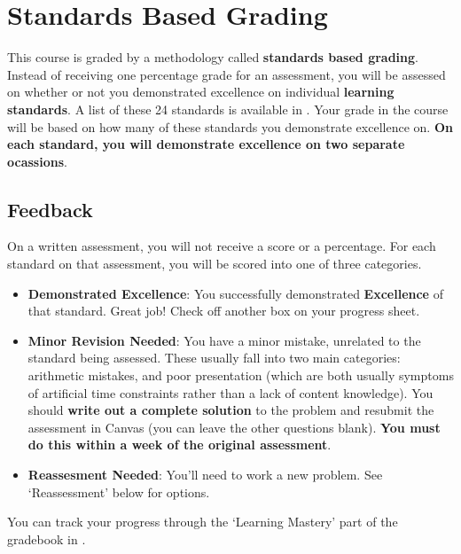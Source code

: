 \documentclass{article}
\begin{document}
\section*{\fontsize{12}{15}\selectfont Standards Based Grading}
This course is graded by a methodology called {\bf standards based grading}.  Instead of receiving one percentage grade for an assessment, you will be assessed on whether or not you demonstrated excellence on individual {\bf learning standards}.  A list of these 24 standards is available in \LMS.  Your grade in the course will be based on how many of these standards you demonstrate excellence on.  {\bf On each standard, you will demonstrate excellence on two separate ocassions}.



    \subsection*{\fontsize{10}{12}\selectfont Feedback}
    On a written assessment, you will not receive a score or a percentage.  For each standard on that assessment, you will be scored into one of three categories.
\begin{itemize}
    \item \textbf{Demonstrated Excellence}: You successfully demonstrated {\bf Excellence} of that standard.  Great job!  Check off another box on your progress sheet.
    \item \textbf{Minor Revision Needed}: You have a minor mistake, unrelated to the standard being assessed.  These usually fall into two main categories: arithmetic mistakes, and poor presentation (which are both usually symptoms of artificial time constraints rather than a lack of content knowledge).  You should {\bf write out a complete solution} to the problem and resubmit the assessment in Canvas (you can leave the other questions blank). \textbf{You must do this within a week of the original assessment}.    
    \item \textbf{Reassesment Needed}: You'll need to work a new problem. See `Reassessment' below for options.
    \end{itemize}

You can track your progress through the `Learning Mastery' part of the gradebook in \LMS. 
\end{document}
